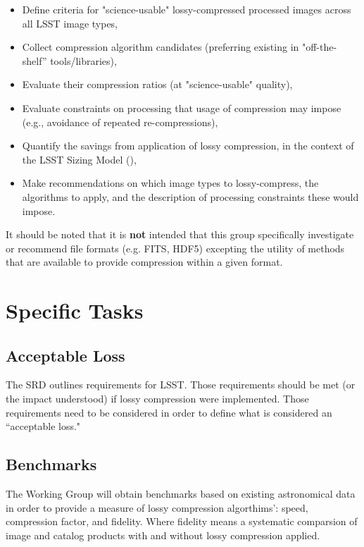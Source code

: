 \begin{itemize}
    \item Define criteria for "science-usable" lossy-compressed processed images across all LSST image types,
    \item Collect compression algorithm candidates (preferring existing in "off-the-shelf” tools/libraries),
    \item Evaluate their compression ratios (at "science-usable" quality),
    \item Evaluate constraints on processing that usage of compression may impose (e.g., avoidance of repeated re-compressions),
    \item Quantify the savings from application of lossy compression, in the context of the LSST Sizing Model (),
    \item Make recommendations on which image types to lossy-compress, the algorithms to apply, and the description of processing constraints these would impose.
\end{itemize}

It should be noted that it is \textbf{not} intended that this group specifically
investigate or recommend file formats (e.g. FITS, HDF5) excepting the utility
of methods that are available to provide compression within a given format.


\section{Specific Tasks}

\subsection{Acceptable Loss}

The SRD outlines requirements for LSST.  Those requirements should be met
(or the impact understood) if lossy compression were implemented.  Those
requirements need to be considered in order to define what is considered
an ``acceptable loss."

\subsection{Benchmarks}

The Working Group will obtain benchmarks based on existing astronomical data in order
to provide a measure of lossy compression algorthims': speed, compression factor,
and fidelity.  Where fidelity means a systematic comparsion of image and catalog
products with and without lossy compression applied.

